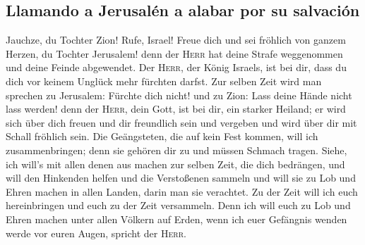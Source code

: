 \hypertarget{llamando-a-jerusaluxe9n-a-alabar-por-su-salvaciuxf3n}{%
\subsection{Llamando a Jerusalén a alabar por su
salvación}\label{llamando-a-jerusaluxe9n-a-alabar-por-su-salvaciuxf3n}}

 Jauchze, du Tochter Zion! Rufe, Israel! Freue dich und
sei fröhlich von ganzem Herzen, du Tochter Jerusalem! 
denn der \textsc{Herr} hat deine Strafe weggenommen und deine Feinde
abgewendet. Der \textsc{Herr}, der König Israels, ist bei dir, dass du
dich vor keinem Unglück mehr fürchten darfst.  Zur selben
Zeit wird man sprechen zu Jerusalem: Fürchte dich nicht! und zu Zion:
Lass deine Hände nicht lass werden!  denn der
\textsc{Herr}, dein Gott, ist bei dir, ein starker Heiland; er wird sich
über dich freuen und dir freundlich sein und vergeben und wird über dir
mit Schall fröhlich sein.  Die Geängsteten, die auf kein
Fest kommen, will ich zusammenbringen; denn sie gehören dir zu und
müssen Schmach tragen.  Siehe, ich will's mit allen denen
aus machen zur selben Zeit, die dich bedrängen, und will den Hinkenden
helfen und die Verstoßenen sammeln und will sie zu Lob und Ehren machen
in allen Landen, darin man sie verachtet.  Zu der Zeit
will ich euch hereinbringen und euch zu der Zeit versammeln. Denn ich
will euch zu Lob und Ehren machen unter allen Völkern auf Erden, wenn
ich euer Gefängnis wenden werde vor euren Augen, spricht der
\textsc{Herr}.
